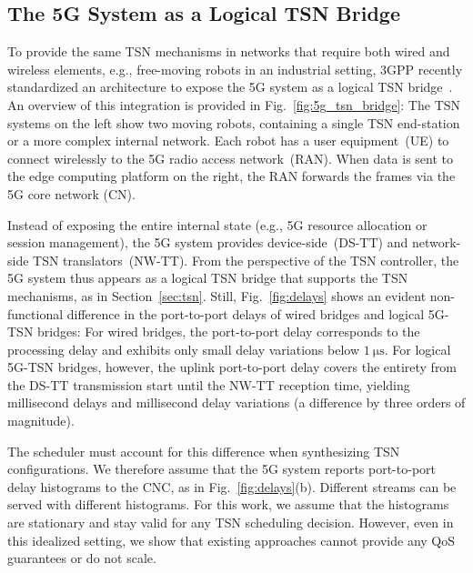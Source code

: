

\subsection{The 5G System as a Logical TSN Bridge} \label{sec:5g_tsn}
To provide the same TSN mechanisms in networks that require both wired and wireless elements, e.g., free-moving robots in an industrial setting, 3GPP recently standardized an architecture to expose the 5G system as a logical TSN bridge~\cite{3gpp.23.501}. 
An overview of this integration is provided in Fig.~\ref{fig:5g_tsn_bridge}:
The TSN systems on the left show two moving robots, containing a single TSN end-station or a more complex internal network.
Each robot has a user equipment~(UE) to connect wirelessly to the 5G radio access network~(RAN).
When data is sent to the edge computing platform on the right, the RAN forwards the frames via the 5G core network (CN).

Instead of exposing the entire internal state (e.g., 5G resource allocation or session management), the 5G system provides device-side~(DS-TT) and network-side TSN translators~(NW-TT).
From the perspective of the TSN controller, the 5G system thus appears as a logical TSN bridge that supports the TSN mechanisms, as in Section~\ref{sec:tsn}.
Still, Fig.~\ref{fig:delays} shows an evident non-functional difference in the port-to-port delays of wired bridges and logical 5G-TSN bridges:
For wired bridges, the port-to-port delay corresponds to the processing delay and exhibits only small delay variations below $\qty{1}{\us}$.
For logical 5G-TSN bridges, however, the uplink port-to-port delay covers the entirety from the DS-TT transmission start until the NW-TT reception time, yielding millisecond delays and millisecond delay variations (a difference by three orders of magnitude).

The scheduler must account for this difference when synthesizing TSN configurations.
We therefore assume that the 5G system reports port-to-port delay histograms to the CNC, as in Fig.~\ref{fig:delays}(b).
Different streams can be served with different histograms.
For this work, we assume that the histograms are stationary and stay valid for any TSN scheduling decision.
However, even in this idealized setting, we show that existing approaches cannot provide any QoS guarantees or do not scale.




